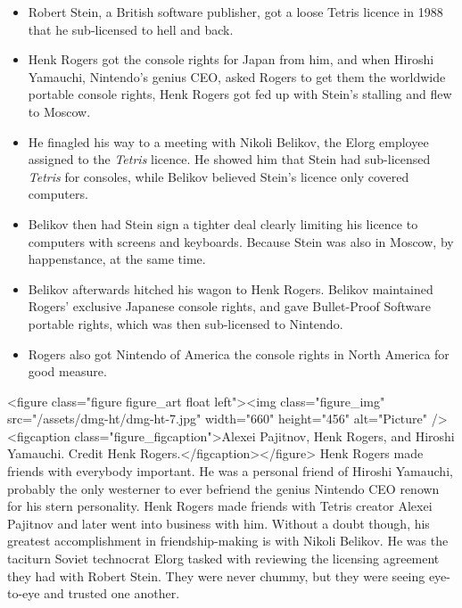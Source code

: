 \documentclass{book}
\begin{document}
\begin{itemize} [nosep]
\item Robert Stein, a British software publisher, got a loose Tetris licence in 1988 that he sub-licensed to hell and back.
\item Henk Rogers got the console rights for Japan from him, and when Hiroshi Yamauchi, Nintendo’s genius CEO, asked Rogers to get them the worldwide portable console rights, Henk Rogers got fed up with Stein’s stalling and flew to Moscow.
\item He finagled his way to a meeting with Nikoli Belikov, the Elorg employee assigned to the \emph{Tetris} licence. He showed him that Stein had sub-licensed \emph{Tetris} for consoles, while Belikov believed Stein’s licence only covered computers.
\item Belikov then had Stein sign a tighter deal clearly limiting his licence to computers with screens and keyboards. Because Stein was also in Moscow, by happenstance, at the same time.
\item Belikov afterwards hitched his wagon to Henk Rogers. Belikov maintained Rogers’ exclusive Japanese console rights, and gave Bullet-Proof Software portable rights, which was then sub-licensed to Nintendo.
\item Rogers also got Nintendo of America the console rights in North America for good measure.
\end{itemize}\noindent

<figure class="figure figure_art float left"><img class="figure_img" src="/assets/dmg-ht/dmg-ht-7.jpg" width="660" height="456" alt="Picture" /><figcaption class="figure_figcaption">Alexei Pajitnov, Henk Rogers, and Hiroshi Yamauchi. Credit Henk Rogers.</figcaption></figure>
Henk Rogers made friends with everybody important. He was a personal friend of Hiroshi Yamauchi, probably the only westerner to ever befriend the genius Nintendo CEO renown for his stern personality. Henk Rogers made friends with Tetris creator Alexei Pajitnov and later went into business with him. Without a doubt though, his greatest accomplishment in friendship-making is with Nikoli Belikov. He was the taciturn Soviet technocrat Elorg tasked with reviewing the licensing agreement they had with Robert Stein. They were never chummy, but they were seeing eye-to-eye and trusted one another.
\end{document}
